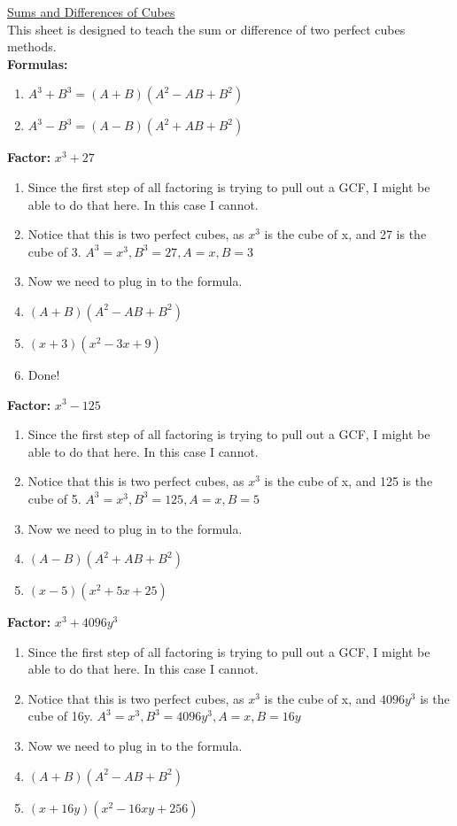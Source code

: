\documentclass{article}
\begin{document}
\newpage
\underline{Sums and Differences of Cubes} \\
This sheet is designed to teach the sum or difference of two perfect cubes methods. \\
\textbf{Formulas:} \\
\begin{enumerate}
\item [] $A^{3}+B^{3} = (A+B)(A^{2}-AB+B^{2})$
\item [] $A^{3}-B^{3} = (A-B)(A^{2}+AB+B^{2})$
\end{enumerate}
\textbf{Factor:} $x^{3} + 27$\\
\begin{enumerate}
\item Since the first step of all factoring is trying to pull out a GCF, I might be able to do that here. In this case I cannot.
\item Notice that this is two perfect cubes, as $x^{3}$ is the cube of x, and 27 is the cube of 3. $A^{3}=x^{3}, B^{3}=27, A=x, B=3$
\item Now we need to plug in to the formula.
\item [] $(A+B)(A^{2}-AB+B^{2})$
\item [] $(x+3)(x^{2}-3x+9)$
\item Done!
\end{enumerate}
\textbf{Factor:} $x^{3} - 125$\\
\begin{enumerate}
\item Since the first step of all factoring is trying to pull out a GCF, I might be able to do that here. In this case I cannot.
\item Notice that this is two perfect cubes, as $x^{3}$ is the cube of x, and 125 is the cube of 5. $A^{3}=x^{3}, B^{3}=125, A=x, B=5$
\item Now we need to plug in to the formula.
\item [] $(A-B)(A^{2}+AB+B^{2})$
\item [] $(x-5)(x^{2}+5x+25)$
\end{enumerate}
\textbf{Factor:} $x^{3} + 4096y^{3}$\\
\begin{enumerate}
\item Since the first step of all factoring is trying to pull out a GCF, I might be able to do that here. In this case I cannot.
\item Notice that this is two perfect cubes, as $x^{3}$ is the cube of x, and $4096y^{3}$ is the cube of 16y. $A^{3}=x^{3}, B^{3}=4096y^{3}, A=x, B=16y$
\item Now we need to plug in to the formula.
\item [] $(A+B)(A^{2}-AB+B^{2})$
\item [] $(x+16y)(x^{2}-16xy+256)$
\end{enumerate}
\end{document}

